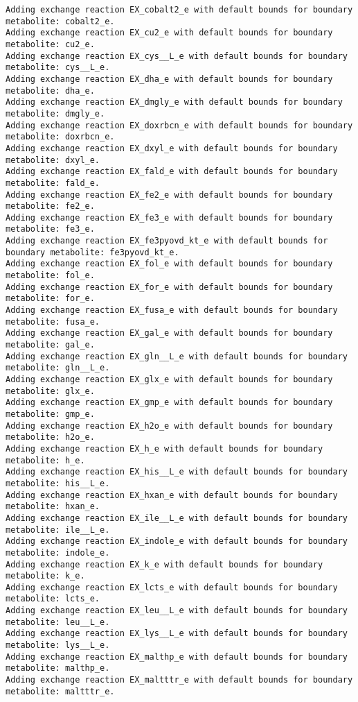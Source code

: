 \documentclass[
  letterpaper,
  DIV=11,
  numbers=noendperiod]{scrartcl}
\begin{document}
\begin{verbatim}
Adding exchange reaction EX_cobalt2_e with default bounds for boundary metabolite: cobalt2_e.
Adding exchange reaction EX_cu2_e with default bounds for boundary metabolite: cu2_e.
Adding exchange reaction EX_cys__L_e with default bounds for boundary metabolite: cys__L_e.
Adding exchange reaction EX_dha_e with default bounds for boundary metabolite: dha_e.
Adding exchange reaction EX_dmgly_e with default bounds for boundary metabolite: dmgly_e.
Adding exchange reaction EX_doxrbcn_e with default bounds for boundary metabolite: doxrbcn_e.
Adding exchange reaction EX_dxyl_e with default bounds for boundary metabolite: dxyl_e.
Adding exchange reaction EX_fald_e with default bounds for boundary metabolite: fald_e.
Adding exchange reaction EX_fe2_e with default bounds for boundary metabolite: fe2_e.
Adding exchange reaction EX_fe3_e with default bounds for boundary metabolite: fe3_e.
Adding exchange reaction EX_fe3pyovd_kt_e with default bounds for boundary metabolite: fe3pyovd_kt_e.
Adding exchange reaction EX_fol_e with default bounds for boundary metabolite: fol_e.
Adding exchange reaction EX_for_e with default bounds for boundary metabolite: for_e.
Adding exchange reaction EX_fusa_e with default bounds for boundary metabolite: fusa_e.
Adding exchange reaction EX_gal_e with default bounds for boundary metabolite: gal_e.
Adding exchange reaction EX_gln__L_e with default bounds for boundary metabolite: gln__L_e.
Adding exchange reaction EX_glx_e with default bounds for boundary metabolite: glx_e.
Adding exchange reaction EX_gmp_e with default bounds for boundary metabolite: gmp_e.
Adding exchange reaction EX_h2o_e with default bounds for boundary metabolite: h2o_e.
Adding exchange reaction EX_h_e with default bounds for boundary metabolite: h_e.
Adding exchange reaction EX_his__L_e with default bounds for boundary metabolite: his__L_e.
Adding exchange reaction EX_hxan_e with default bounds for boundary metabolite: hxan_e.
Adding exchange reaction EX_ile__L_e with default bounds for boundary metabolite: ile__L_e.
Adding exchange reaction EX_indole_e with default bounds for boundary metabolite: indole_e.
Adding exchange reaction EX_k_e with default bounds for boundary metabolite: k_e.
Adding exchange reaction EX_lcts_e with default bounds for boundary metabolite: lcts_e.
Adding exchange reaction EX_leu__L_e with default bounds for boundary metabolite: leu__L_e.
Adding exchange reaction EX_lys__L_e with default bounds for boundary metabolite: lys__L_e.
Adding exchange reaction EX_malthp_e with default bounds for boundary metabolite: malthp_e.
Adding exchange reaction EX_maltttr_e with default bounds for boundary metabolite: maltttr_e.

\end{verbatim}
\end{document}
